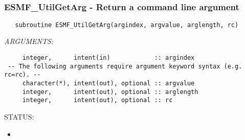  
\setlength{\oldparskip}{\parskip}
\setlength{\parskip}{1.5ex}
\setlength{\oldparindent}{\parindent}
\setlength{\parindent}{0pt}
\setlength{\oldbaselineskip}{\baselineskip}
\setlength{\baselineskip}{11pt}
 
\def\bv{\begin{verbatim}}
\def\ev{\end{verbatim}}
\def\be{\begin{equation}}
\def\ee{\end{equation}}
\def\bea{\begin{eqnarray}}
\def\eea{\end{eqnarray}}
\def\bi{\begin{itemize}}
\def\ei{\end{itemize}}
\def\bn{\begin{enumerate}}
\def\en{\end{enumerate}}
\def\bd{\begin{description}}
\def\ed{\end{description}}
\def\({\left (}
\def\){\right )}
\def\[{\left [}
\def\]{\right ]}
\def\<{\left  \langle}
\def\>{\right \rangle}
\def\cI{{\cal I}}
\def\diag{\mathop{\rm diag}}
\def\tr{\mathop{\rm tr}}


 

  
 
\mbox{}\hrulefill\ 
 
\subsubsection [ESMF\_UtilGetArg] {ESMF\_UtilGetArg - Return a command line argument}


  
\begin{verbatim}   subroutine ESMF_UtilGetArg(argindex, argvalue, arglength, rc)\end{verbatim}{\em ARGUMENTS:}
\begin{verbatim}     integer,      intent(in)            :: argindex
 -- The following arguments require argument keyword syntax (e.g. rc=rc). --
     character(*), intent(out), optional :: argvalue
     integer,      intent(out), optional :: arglength
     integer,      intent(out), optional :: rc\end{verbatim}
{\sf STATUS:}
   \begin{itemize}
   \item{}
   \end{itemize}
  
